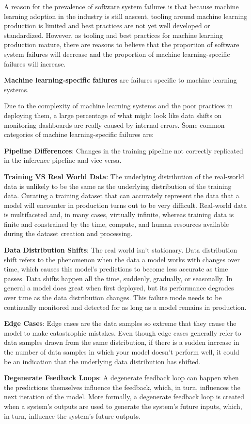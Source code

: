 A reason for the prevalence of software system failures is that because machine learning adoption in the industry is
still nascent, tooling around machine learning production is limited and best practices are not yet well developed or
standardized. However, as tooling and best practices for machine learning production mature, there are reasons to
believe that the proportion of software system failures will decrease and the proportion of machine learning-specific
failures will increase.

\textbf{Machine learning-specific failures} are failures specific to machine learning systems.
\ed

Due to the complexity of machine learning systems and the poor practices in deploying them, a large percentage of
what might look like data shifts on monitoring dashboards are really caused by internal errors. \v

Some common categories of machine learning-specific failures are:
\bit
\item \textbf{Pipeline Differences}: Changes in the training pipeline not correctly replicated in the inference pipeline
and vice versa.
\item \textbf{Training VS Real World Data}: The underlying distribution of the real-world data is unlikely to be the
same as the underlying distribution of the training data. Curating a training dataset that can accurately represent
the data that a model will encounter in production turns out to be very difficult. Real-world data is multifaceted
and, in many cases, virtually infinite, whereas training data is finite and constrained by the time, compute, and
human resources available during the dataset creation and processing.
\item \textbf{Data Distribution Shifts}: The real world isn't stationary. Data distribution shift refers to the
phenomenon when the data a model works with changes over time, which causes this model's predictions to become less
accurate as time passes. Data shifts happen all the time, suddenly, gradually, or seasonally. In general a model does
great when first deployed, but its performance degrades over time as the data distribution changes. This failure mode
needs to be continually monitored and detected for as long as a model remains in production.
\item \textbf{Edge Cases}: Edge cases are the data samples so extreme that they cause the model to make catastrophic
mistakes. Even though edge cases generally refer to data samples drawn from the same distribution, if there is a
sudden increase in the number of data samples in which your model doesn't perform well, it could be an indication
that the underlying data distribution has shifted.
\item \textbf{Degenerate Feedback Loops}: A degenerate feedback loop can happen when the predictions themselves
influence the feedback, which, in turn, influences the next iteration of the model. More formally, a degenerate
feedback loop is created when a system's outputs are used to generate the system's future inputs, which, in turn,
influence the system's future outputs.
\eit

